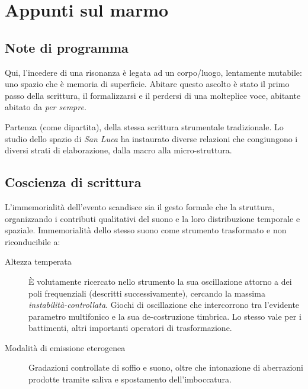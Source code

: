
\chapter{Appunti sul marmo}
\label{cap:appunti}

\section{Note di programma}

Qui, l’incedere di una risonanza è legata ad un corpo/luogo, lentamente mutabile:
uno spazio che è memoria di superficie. Abitare questo ascolto è stato il primo
passo della scrittura, il formalizzarsi e il perdersi di una molteplice voce,
abitante abitato da \emph{per sempre}.

Partenza (come dipartita), della stessa scrittura strumentale tradizionale. 
Lo studio dello spazio di \emph{San Luca} ha instaurato diverse relazioni che
congiungono i diversi strati di elaborazione, dalla macro alla micro-struttura.

\section{Coscienza di scrittura}

L'immemorialità dell'evento scandisce sia il gesto formale che la struttura,
organizzando i contributi qualitativi del suono e la loro distribuzione
temporale e spaziale. Immemorialità dello stesso suono come strumento trasformato
e non riconducibile a:

\begin{description}
	\item[ Altezza temperata ] È volutamente ricercato nello strumento la sua
	oscillazione  attorno a dei poli frequenziali (descritti successivamente),
	cercando la massima \emph{instabilità-controllata}. Giochi di oscillazione che
	intercorrono tra l’evidente parametro multifonico e la sua de-costruzione
	timbrica. Lo stesso vale per i battimenti, altri importanti operatori di
	trasformazione.
	\item[ Modalità di emissione eterogenea ] Gradazioni controllate di soffio e
	suono, oltre che intonazione di aberrazioni prodotte tramite saliva e
	spostamento dell'imboccatura.     
\end{description}

